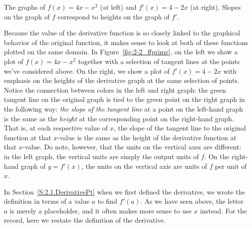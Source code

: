 \begin{marginfigure} %
\caption{The graphs of $f(x) = 4x - x^2$ (at left) and $f'(x) = 4 - 2x$ (at right).  Slopes on the graph of $f$ correspond to heights on the graph of $f'$.}
\label{fig:2-2_ffprime}
\end{marginfigure}

Because the value of the derivative function is so closely linked to the graphical behavior of the original function, it makes sense to look at both of these functions plotted on the same domain.  In Figure~\ref{fig:2-2_ffprime}, on the left we show a plot of $f(x) = 4x - x^2$ together with a selection of tangent lines at the points we've considered above.  On the right, we show a plot of $f'(x) = 4 - 2x$ with emphasis on the heights of the derivative graph at the same selection of points.  Notice the connection between colors in the left and right graph:  the green tangent line on the original graph is tied to the green point on the right graph in the following way:  \emph{the slope of the tangent line} at a point on the left-hand graph is the same as the \emph{height} at the corresponding point on the right-hand graph.  That is, at each respective value of $x$, the slope of the tangent line to the original function at that $x$-value is the same as the height of the derivative function at that $x$-value.  Do note, however, that the units on the vertical axes are different:  in the left graph, the vertical units are simply the output units of $f$.  On the right-hand graph of $y = f'(x)$, the units on the vertical axis are units of $f$ per unit of $x$.


In Section~\ref{S:2.1.DerivativePt} when we first defined the derivative, we wrote the definition in terms of a value $a$ to find $f'(a)$.  As we have seen above, the letter $a$ is merely a placeholder, and it often makes more sense to use $x$ instead.  For the record, here we restate the  definition of the derivative.

